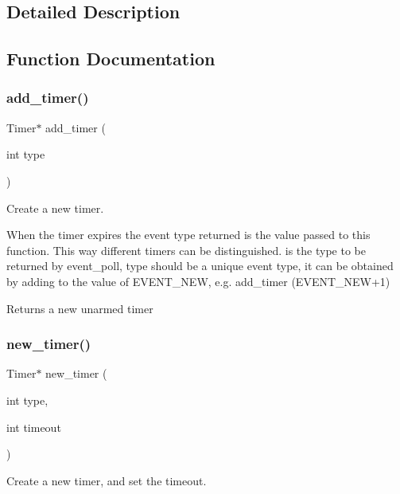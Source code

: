\subsection{Detailed Description}


\subsection{Function Documentation}
\mbox{\label{group__timer_ga0aaa8477c77e036e7f41f7704721b9f7}} 
\subsubsection{\texorpdfstring{add\+\_\+timer()}{add\_timer()}}
{\footnotesize\ttfamily Timer$\ast$ add\+\_\+timer (\begin{DoxyParamCaption}\item[{int}]{type }\end{DoxyParamCaption})}



Create a new timer. 

When the timer expires the event type returned is the value passed to this function. This way different timers can be distinguished.  is the type to be returned by event\+\_\+poll, type should be a unique event type, it can be obtained by adding to the value of E\+V\+E\+N\+T\+\_\+\+N\+EW, e.\+g. add\+\_\+timer (E\+V\+E\+N\+T\+\_\+\+N\+E\+W+1) \begin{DoxyReturn}{Returns}
a new unarmed timer 
\end{DoxyReturn}
\mbox{\label{group__timer_gab1f067b2c41862d5cf2a06ca8a5359da}} 
\subsubsection{\texorpdfstring{new\+\_\+timer()}{new\_timer()}}
{\footnotesize\ttfamily Timer$\ast$ new\+\_\+timer (\begin{DoxyParamCaption}\item[{int}]{type,  }\item[{int}]{timeout }\end{DoxyParamCaption})}

Create a new timer, and set the timeout.

